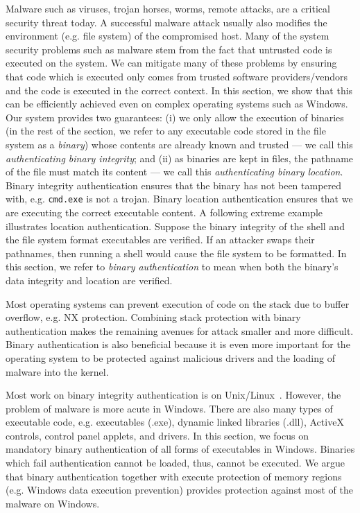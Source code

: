
Malware such as viruses, trojan horses, worms, remote attacks, 
are a critical security threat today.
A successful malware attack usually also modifies
the environment (e.g. file system) of the compromised host.
Many of the system security problems such as malware stem from the fact that untrusted code is executed
on the system.
We can mitigate many of these problems by ensuring that code which is executed only comes
from trusted software providers/vendors and the code is executed in the correct context.
In this section, we show that this can be efficiently achieved even on complex
operating systems such
as Windows. Our system provides two guarantees:
(i) we only allow the execution of binaries (in the rest of the section, we refer
to any executable code stored in the file system as a {\em binary})
whose contents are already known and trusted --- we call this {\em authenticating binary integrity};
and (ii) as binaries are kept in files, the pathname of the file must 
match its content --- we call this {\em authenticating binary location}. 
Binary integrity authentication ensures that the binary has not been
tampered with, e.g. {\tt cmd.exe} is not a trojan.
Binary location authentication ensures that we are executing
the correct executable content. 
A following extreme example illustrates location authentication. 
Suppose the binary integrity of the shell and the file system format executables 
are verified. If an attacker swaps their pathnames,
then running a shell would cause the file system to be formatted.
In this section, we refer to {\em binary authentication} to mean when 
both the binary's data integrity and location are verified.

Most operating systems can prevent execution of code
on the stack due to buffer overflow, e.g. NX protection.
Combining stack protection with binary authentication
makes the remaining avenues for attack 
smaller and more difficult.
Binary authentication is also beneficial because it is even more important
for the operating system to be protected against malicious drivers
and the loading of malware into the kernel.

Most work on binary integrity authentication is on
Unix/Linux~\cite{apvrille2004digsig,williams2002anti,doorn01signedexecutables}.
However, the problem of malware is more acute in Windows.
There are also many types of executable code,
e.g. executables (.exe), dynamic linked libraries (.dll), 
ActiveX controls, control panel applets, and drivers. 
In this section, we focus on mandatory binary authentication of all forms
of executables in Windows. 
Binaries which fail authentication cannot be loaded, thus,
cannot be executed. We argue that binary authentication together with 
execute protection of memory regions (e.g. Windows data execution prevention) 
provides protection against most of the malware on Windows.

